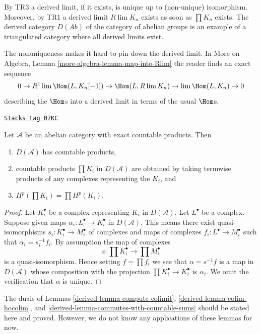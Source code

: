 By TR3 a derived limit, if it exists, is unique up to (non-unique)
isomorphism. Moreover, by TR1 a derived limit $R\lim K_n$ exists
as soon as $\prod K_n$ exists. The derived category $D(\textit{Ab})$
of the category of abelian groups is an example of a triangulated category
where all derived limits exist.

\medskip\noindent
The nonuniqueness makes it hard to pin down the derived limit. In
More on Algebra, Lemma \ref{more-algebra-lemma-map-into-Rlim}
the reader finds an exact sequence
$$
0 \to R^1\lim \Hom(L, K_n[-1]) \to \Hom(L, R\lim K_n)
\to \lim \Hom(L, K_n) \to 0
$$
describing the $\Hom$s into a derived limit in terms of the
usual $\Hom$s.

\begin{lemma}[Products]
\label{derived-lemma-products}
\href{https://stacks.math.columbia.edu/tag/07KC}{\texttt{Stacks tag 07KC}}

Let $\mathcal{A}$ be an abelian category with exact
countable products. Then
\begin{enumerate}
\item $D(\mathcal{A})$ has countable products,
\item countable products $\prod K_i$ in $D(\mathcal{A})$ are obtained by
taking termwise products of any complexes representing the $K_i$, and
\item $H^p(\prod K_i) = \prod H^p(K_i)$.
\end{enumerate}
\end{lemma}

\begin{proof}
Let $K_i^\bullet$ be a complex representing $K_i$ in $D(\mathcal{A})$.
Let $L^\bullet$ be a complex. Suppose given maps
$\alpha_i : L^\bullet \to K_i^\bullet$ in $D(\mathcal{A})$.
This means there exist quasi-isomorphisms $s_i : K_i^\bullet \to M_i^\bullet$
of complexes and maps of complexes $f_i : L^\bullet \to M_i^\bullet$
such that $\alpha_i = s_i^{-1}f_i$. By assumption the map of complexes
$$
s : \prod K_i^\bullet \longrightarrow \prod M_i^\bullet
$$
is a quasi-isomorphism. Hence setting $f = \prod f_i$ we see that
$\alpha = s^{-1}f$ is a map in $D(\mathcal{A})$ whose composition
with the projection $\prod K_i^\bullet \to K_i^\bullet$ is $\alpha_i$.
We omit the verification that $\alpha$ is unique.
\end{proof}

The duals of Lemmas \ref{derived-lemma-compute-colimit},
\ref{derived-lemma-colim-hocolim}, and
\ref{derived-lemma-commutes-with-countable-sums}
should be stated here and proved. However, we do not know any applications
of these lemmas for now.

